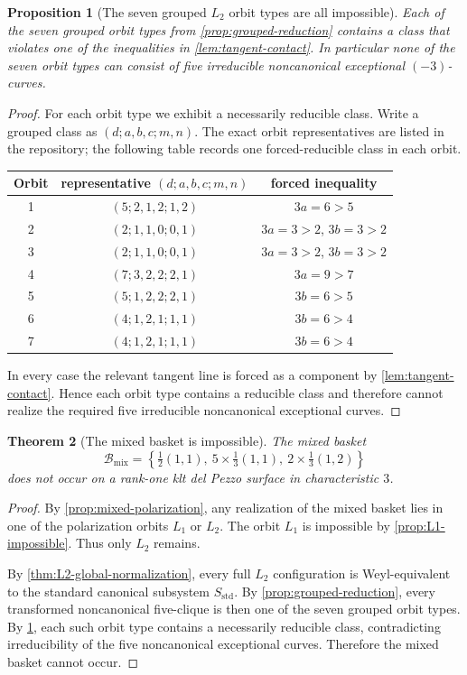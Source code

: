 \documentclass[11pt]{article}
\newtheorem{theorem}{Theorem}[section]
\newtheorem{proposition}[theorem]{Proposition}
\theoremstyle{definition}
\begin{document}
\begin{proposition}[The seven grouped $L_2$ orbit types are all impossible]\label{prop:seven-orbits}
Each of the seven grouped orbit types from \cref{prop:grouped-reduction} contains a class that violates one of the inequalities in \cref{lem:tangent-contact}. In particular none of the seven orbit types can consist of five irreducible noncanonical exceptional $(-3)$-curves.
\end{proposition}

\begin{proof}
For each orbit type we exhibit a necessarily reducible class. Write a grouped class as $(d;a,b,c;m,n)$. The exact orbit representatives are listed in the repository; the following table records one forced-reducible class in each orbit.

\begin{center}
\begin{tabular}{c|c|c}
\toprule
Orbit & representative $(d;a,b,c;m,n)$ & forced inequality \\
\midrule
1 & $(5;2,1,2;1,2)$ & $3a=6>5$ \\
2 & $(2;1,1,0;0,1)$ & $3a=3>2$, $3b=3>2$ \\
3 & $(2;1,1,0;0,1)$ & $3a=3>2$, $3b=3>2$ \\
4 & $(7;3,2,2;2,1)$ & $3a=9>7$ \\
5 & $(5;1,2,2;2,1)$ & $3b=6>5$ \\
6 & $(4;1,2,1;1,1)$ & $3b=6>4$ \\
7 & $(4;1,2,1;1,1)$ & $3b=6>4$ \\
\bottomrule
\end{tabular}
\end{center}

In every case the relevant tangent line is forced as a component by \cref{lem:tangent-contact}. Hence each orbit type contains a reducible class and therefore cannot realize the required five irreducible noncanonical exceptional curves.
\end{proof}

\begin{theorem}[The mixed basket is impossible]\label{thm:mixed-impossible}
The mixed basket
\[
\mathcal B_{\mathrm{mix}}=\left\{\tfrac12(1,1),\ 5\times\tfrac13(1,1),\ 2\times\tfrac13(1,2)\right\}
\]
does not occur on a rank-one klt del Pezzo surface in characteristic $3$.
\end{theorem}

\begin{proof}
By \cref{prop:mixed-polarization}, any realization of the mixed basket lies in one of the polarization orbits $L_1$ or $L_2$. The orbit $L_1$ is impossible by \cref{prop:L1-impossible}. Thus only $L_2$ remains.

By \cref{thm:L2-global-normalization}, every full $L_2$ configuration is Weyl-equivalent to the standard canonical subsystem $S_{\mathrm{std}}$. By \cref{prop:grouped-reduction}, every transformed noncanonical five-clique is then one of the seven grouped orbit types. By \cref{prop:seven-orbits}, each such orbit type contains a necessarily reducible class, contradicting irreducibility of the five noncanonical exceptional curves. Therefore the mixed basket cannot occur.
\end{proof}
\end{document}
